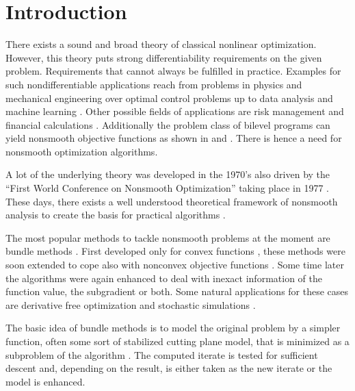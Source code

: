 \section{Introduction}

There exists a sound and broad theory of classical nonlinear optimization. However, this theory puts strong differentiability requirements on the given problem. Requirements that cannot always be fulfilled in practice.
Examples for such nondifferentiable applications reach from problems in physics and mechanical engineering \cite{Clarke1990} over optimal control problems up to data analysis \cite{Bagirov2014} and machine learning \cite{Smola2007}.
Other possible fields of applications are risk management and financial calculations \cite{Nesterov2016,Teo2010}. 
Additionally the problem class of bilevel programs can yield nonsmooth objective functions as shown in \cite{Outrata1998} and \cite{Moore2011}.
There is hence a need for nonsmooth optimization algorithms.

A lot of the underlying theory was developed in the 1970's also driven by the ``First World Conference on Nonsmooth Optimization'' taking place in 1977 \cite{Mifflin2012}.
These days, there exists a well understood theoretical framework of nonsmooth analysis to create the basis for practical algorithms \cite{Rockafellar2009}.

The most popular methods to tackle nonsmooth problems at the moment are bundle methods \cite{Hare2016}. First developed only for convex functions \cite{Lemarechal1978}, these methods were soon extended to cope also with nonconvex objective functions \cite{Mifflin1982}.
Some time later the algorithms were again enhanced to deal with inexact information of the function value, the subgradient or both.
Some natural applications for these cases are derivative free optimization and stochastic simulations \cite{Hare2016}.



The basic idea of bundle methods is to model the original problem by a simpler function, often some sort of stabilized cutting plane model, that is minimized as a subproblem of the algorithm \cite[chapter XV]{Hiriart-Urruty1993}. 
The computed iterate is tested for sufficient descent and, depending on the result, is either taken as the new iterate or the model is enhanced.

